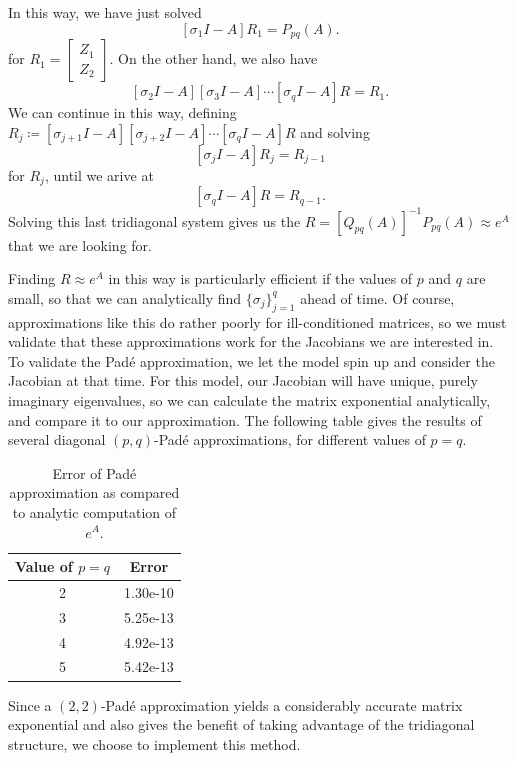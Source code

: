 \documentclass{csri19}
\begin{document}
In this way, we have just solved 
\[ \left[\sigma_1I-A\right]R_1 = P_{pq}(A).\] for $R_1 = \begin{bmatrix} Z_1\\ Z_2\end{bmatrix}$. 
On the other hand, we also have
\[\left[\sigma_2I-A\right]\left[\sigma_3I-A\right]\cdots\left[\sigma_qI-A\right]R = R_1.\] 
We can continue in this way, defining 
$R_j \coloneqq \left[\sigma_{j+1}I-A\right]\left[\sigma_{j+2}I-A\right]\cdots\left[\sigma_qI-A\right]R$
 and solving
\[\left[\sigma_jI-A\right]R_j = R_{j-1}\] 
for $R_j$, until we arive at
\[\left[\sigma_qI-A\right]R = R_{q-1}.\] 
Solving this last tridiagonal system gives us the $R = \left[Q_{pq}(A)\right]^{-1}P_{pq}(A)\approx e^A$
 that we are looking for.

Finding $R \approx e^A$ in this way is particularly efficient if the values
 of $p$ and $q$ are small, so that we can analytically find 
$\{\sigma_j\}_{j=1}^q$ ahead of time. Of course, approximations like this 
do rather poorly for ill-conditioned matrices, so we must validate that 
these approximations work for the Jacobians we are interested in. To 
validate the Pad\'e approximation, we let the model spin up and consider 
the Jacobian at that time. For this model, our Jacobian will have unique, 
purely imaginary eigenvalues, so we can calculate the matrix exponential 
analytically, and compare it to our approximation. The following table 
gives the results of several diagonal $(p,q)$-Pad\'e approximations, for 
different values of $p=q$.
\begin{table}[ht]
  \begin{center}
    \caption{Error of Pad\'e approximation as compared to analytic 
               computation of $e^A$.}
    \label{CFK:tab:PadeError}
    \begin{tabular}{|c|c|}
      \hline
      \textbf{Value of $p=q$} & \textbf{Error}\\
      \hline
      2 & 1.30e-10 \\
      3 & 5.25e-13 \\
      4 & 4.92e-13 \\
      5 & 5.42e-13 \\
      \hline
    \end{tabular}
  \end{center}
\end{table}

Since a $(2,2)$-Pad\'e approximation yields a considerably accurate matrix 
exponential and also gives the benefit of taking advantage of the 
tridiagonal structure, we choose to implement this method.
\end{document}

